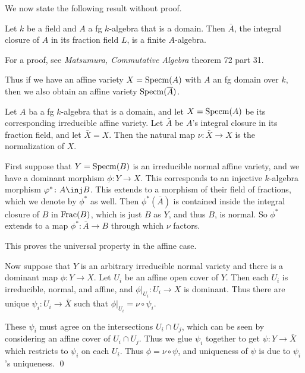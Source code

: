 We now state the following result without proof.

\bthrm

    Let $k$ be a field and $A$ a fg $k$-algebra that is a domain.
    Then $\bar A$, the integral closure of $A$ in its fraction field $L$, is a finite $A$-algebra.

\ethrm

\bnote

    For a proof, see {\it Matsumura, Commutative Algebra\/} theorem 72 part 31.

\enote

Thus if we have an affine variety $X={\rm Specm}(A)$ with $A$ an fg domain over $k$, then we also obtain an affine variety ${\rm Specm}({\overline{A}})$.

\bprop

    Let $A$ ba a fg $k$-algebra that is a domain, and let $X={\rm Specm}(A)$ be its corresponding irreducible affine variety.
    Let $\bar A$ be $A$'s integral closure in its fraction field, and let $\bar X=X$.
    Then the natural map $\nu\colon\bar X\to X$ is the normalization of $X$.

\eprop

\bproof

    First suppose that $Y={\rm Specm}(B)$ is an irreducible normal affine variety, and we have a dominant morphism $\phi\colon Y\to X$.
    This corresponds to an injective $k$-algebra morphism $\phi^*\colon A\inj B$.
    This extends to a morphism of their field of fractions, which we denote by $\phi^*$ as well.
    Then $\phi^*(\bar A)$ is contained inside the integral closure of $B$ in ${\rm Frac}(B)$, which is just $B$ as $Y$, and thus $B$, is normal.
    So $\phi^*$ extends to a map $\phi^*\colon\bar A\to B$ through which $\nu$ factors.

    This proves the universal property in the affine case.

    Now suppose that $Y$ is an arbitrary irreducible normal variety and there is a dominant map $\phi\colon Y\to X$.
    Let $U_i$ be an affine open cover of $Y$.
    Then each $U_i$ is irreducible, normal, and affine, and $\phi|_{U_i}\colon U_i\to X$ is dominant.
    Thus there are unique $\psi_i\colon U_i\to\bar X$ such that $\phi|_{U_i}=\nu\circ\psi_i$.

    These $\psi_i$ must agree on the intersections $U_i\cap U_j$, which can be seen by considering an affine cover of $U_i\cap U_j$.
    Thus we glue $\psi_i$ together to get $\psi\colon Y\to\bar X$ which restricts to $\psi_i$ on each $U_i$.
    Thus $\phi=\nu\circ\psi$, and uniqueness of $\psi$ is due to $\psi_i$'s uniqueness.
    \qed

